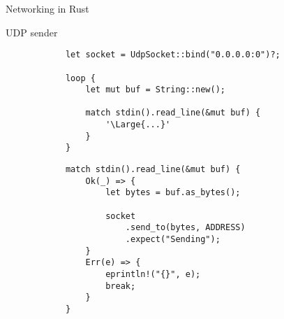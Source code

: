 \begin{frame}[fragile]{Networking in Rust}
    \begin{block}{UDP sender}
        \begin{overprint}
            \begin{verbatim}
            let socket = UdpSocket::bind("0.0.0.0:0")?;

            loop {
                let mut buf = String::new();
            
                match stdin().read_line(&mut buf) {
                    '\Large{...}'
                }
            }
            \end{verbatim}

            \begin{verbatim}
            match stdin().read_line(&mut buf) {
                Ok(_) => {
                    let bytes = buf.as_bytes();
        
                    socket
                        .send_to(bytes, ADDRESS)
                        .expect("Sending");
                }
                Err(e) => {
                    eprintln!("{}", e);
                    break;
                }
            }
            \end{verbatim}
        \end{overprint}
    \end{block}
\end{frame}
